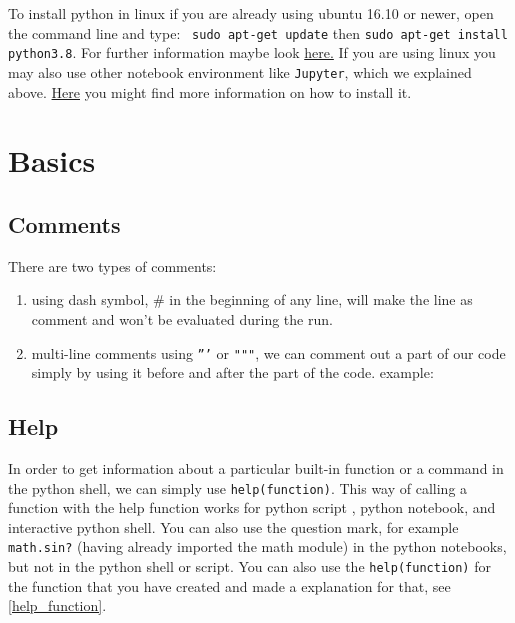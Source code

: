 \documentclass[10pt,a4paper]{article}
\newcommand{\te}{\texttt}
\begin{document}
To install python in linux if you are already using ubuntu 16.10 or newer, open the command line and type: \te{ sudo apt-get update} then \te{sudo apt-get install python3.8}. For further information maybe look \href{https://docs.python-guide.org/starting/install3/linux/}{here.} If you are using linux you may also use other notebook environment like \te{Jupyter}, which we explained above. \href{https://jupyter.org/install}{Here} you might find more information on how to install it.











\section{Basics}


\subsection{Comments}
There are two types of comments:
\begin{enumerate}
\item using dash symbol, $\#$ in the beginning of any line, will make the line as comment and won't be evaluated during the run.
\item multi-line comments using \texttt{'''} or \texttt{"""}, we can comment out a part of our code simply by using it before and after the part of the code.
example:

\end{enumerate}


\subsection{Help}
In order to get information about a particular built-in function or a command in the python shell, we can simply use  \texttt{help(function)}. This way of calling a function with the help function works for python script , python notebook, and interactive python shell. You can also use the question mark, for example \texttt{math.sin?} (having already imported the math module)  in the python notebooks, but not in the python shell or script. You can also use the \texttt{help(function)} for the function that you have created and made a explanation for that, see \ref{help_function}.
\end{document}

